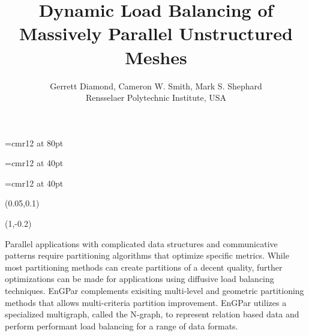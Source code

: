 \documentclass{beamer}
\begin{document}
\font\titlefont=cmr12 at 80pt
\title[Load Balancing of Unstructured Meshes]
      {\titlefont
        Dynamic Load Balancing of \\[0.3cm]Massively Parallel Unstructured Meshes
      }
      \font\authorfont=cmr12 at 40pt
      \author[G. Diamond]{\authorfont
        Gerrett Diamond, Cameron W. Smith, Mark S. Shephard\\
        Rensselaer Polytechnic Institute, USA}
      \date{}
\font\abstractfont=cmr12 at 40pt
      \begin{textblock}{15.8}(0.05,0.1)
        \titlepage
        \begin{textblock}{14}(1,-0.2)
          \begin{block}{}
            \begin{center}
              \abstractfont
              Parallel applications with complicated data structures and communicative patterns require partitioning algorithms that optimize specific metrics. While most partitioning methods can create partitions of a decent quality, further optimizations can be made for applications using diffusive load balancing techniques. EnGPar complements exisiting multi-level and geometric partitioning methods that allows multi-criteria partition improvement. EnGPar utilizes a specialized multigraph, called the N-graph, to represent relation based data and perform performant load balancing for a range of data formats.
              
            \end{center}
          \end{block}
        \end{textblock}
      \end{textblock}
\end{document}
